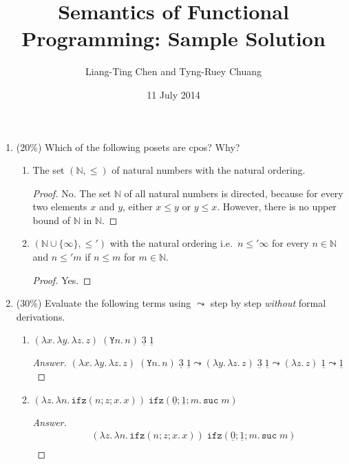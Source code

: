 \documentclass{article}
\title{Semantics of Functional Programming: Sample Solution}
\author{Liang-Ting Chen and Tyng-Ruey Chuang}
\date{11 July 2014}
\begin{document}
\maketitle

\begin{enumerate}
  \item (20\%) Which of the following posets are cpos? Why?
    \begin{enumerate}
      \item The set $(\mathbb{N}, \leq)$
        of natural numbers with the natural ordering. 
        \begin{proof}
          No. The set $\mathbb{N}$ of all natural numbers is directed, because
          for every two elements $x$ and $y$, either $x \leq y$ or $y \leq x$.
          However, there is no upper bound of $\mathbb{N}$ in $\mathbb{N}$.
        \end{proof}
      \item $(\mathbb{N} \cup \{\infty\}, \leq')$ with the natural ordering
        i.e.\ $n \leq' \infty$ for every $n \in \mathbb{N}$
        and $n \leq' m$ if $n \leq m$ for $m \in \mathbb{N}$. 
        \begin{proof}
          Yes. 
        \end{proof}
    \end{enumerate}
  \item (30\%) Evaluate the following terms using $\leadsto$ step by step
    \emph{without} formal derivations.
    \begin{enumerate}
      \item $(\lambda x.\, \lambda y.\, \lambda z.\, z) \;(\mathtt{Y} n.\,
        n)\;\underline{3}\;\underline{1}$
        \begin{proof}[Answer]
          $(\lambda x.\, \lambda y.\, \lambda z.\, z)
          \;(\mathtt{Y} n.\, n)\;\underline{3}\;\underline{1}
          \leadsto (\lambda y.\,\lambda z.\, z)\;\underline{3}\;\underline{1}
          \leadsto (\lambda z.\, z)\;\underline{1}
          \leadsto \underline{1}$
        \end{proof}
      \item $\left(\lambda z.\,\lambda n.\,\mathtt{ifz}(n; z; x.\,x)\right)\;
        \mathtt{ifz}(\underline{0}; \underline{1}; m.\, \mathtt{suc}\;m)$
        \begin{proof}[Answer]
          \begin{align*}
            & \left(\lambda z.\,\lambda n.\,\mathtt{ifz}(n; z; x.\,x)\right)\;
            \mathtt{ifz}(\underline{0}; \underline{1}; m.\, \mathtt{suc}\;m) \\

\end{align*}
\end{proof}
\end{enumerate}
\end{enumerate}
\end{document}
